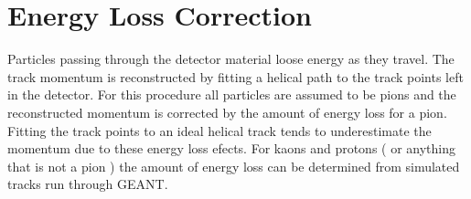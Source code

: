 

\chapter{Energy Loss Correction}\label{chap:energyLossCorrection}
Particles passing through the detector material loose energy as they travel. The track momentum is reconstructed by fitting a helical path to the track points left in the detector. For this procedure all particles are assumed to be pions and the reconstructed momentum is corrected by the amount of energy loss for a pion. Fitting the track points to an ideal
helical track tends to underestimate the momentum due to these energy loss efects. For kaons and protons ( or anything that is not a pion ) the amount of energy loss can be determined from simulated tracks run through GEANT.